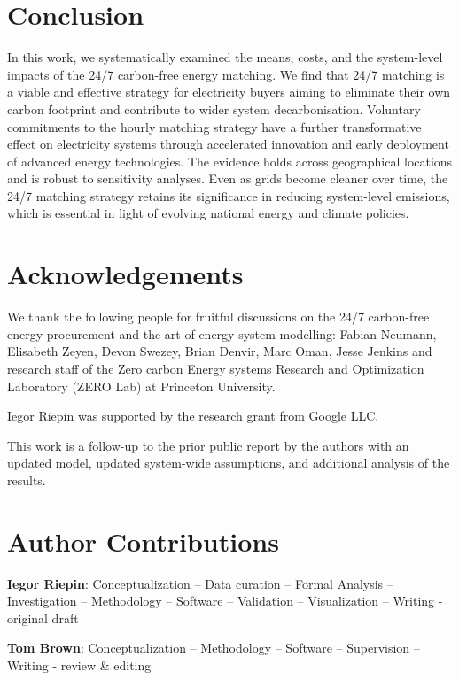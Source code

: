 \documentclass[11pt, 5p, nopreprintline]{elsarticle}
\begin{document}
\section{Conclusion}
\label{sec:conclusion}

In this work, we systematically examined the means, costs, and the system-level impacts of the 24/7 carbon-free energy matching.
We find that 24/7 matching is a viable and effective strategy for electricity buyers aiming to eliminate their own carbon footprint and contribute to wider system decarbonisation.
Voluntary commitments to the hourly matching strategy have a further transformative effect on electricity systems through accelerated innovation and early deployment of advanced energy technologies.
The evidence holds across geographical locations and is robust to sensitivity analyses.
Even as grids become cleaner over time, the 24/7 matching strategy retains its significance in reducing system-level emissions, which is essential in light of evolving national energy and climate policies.

\section*{Acknowledgements}

We thank the following people for fruitful discussions on the 24/7 carbon-free energy procurement and the art of energy system modelling: Fabian Neumann, Elisabeth Zeyen, Devon Swezey, Brian Denvir, Marc Oman, Jesse Jenkins and research staff of the Zero carbon Energy systems Research and Optimization Laboratory (ZERO Lab) at Princeton University.

Iegor Riepin was supported by the research grant from Google LLC.

This work is a follow-up to the prior public report by the authors \cite{riepin-zenodo-systemlevel247} with an updated model, updated system-wide assumptions, and additional analysis of the results.

\section*{Author Contributions}


\textbf{Iegor Riepin}:
Conceptualization --
Data curation --
Formal Analysis --
Investigation --
Methodology --
Software --
Validation --
Visualization --
Writing - original draft

\textbf{Tom Brown}:
Conceptualization --
Methodology --
Software --
Supervision --
Writing - review \& editing
\end{document}
